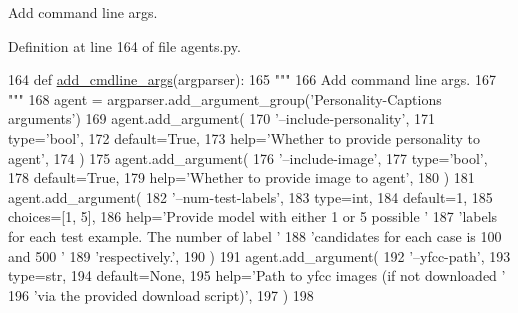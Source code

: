 \begin{DoxyVerb}Add command line args.
\end{DoxyVerb}
 

Definition at line 164 of file agents.\+py.


\begin{DoxyCode}
164     \textcolor{keyword}{def }\hyperlink{namespaceparlai_1_1agents_1_1drqa_1_1config_a62fdd5554f1da6be0cba185271058320}{add\_cmdline\_args}(argparser):
165         \textcolor{stringliteral}{"""}
166 \textcolor{stringliteral}{        Add command line args.}
167 \textcolor{stringliteral}{        """}
168         agent = argparser.add\_argument\_group(\textcolor{stringliteral}{'Personality-Captions arguments'})
169         agent.add\_argument(
170             \textcolor{stringliteral}{'--include-personality'},
171             type=\textcolor{stringliteral}{'bool'},
172             default=\textcolor{keyword}{True},
173             help=\textcolor{stringliteral}{'Whether to provide personality to agent'},
174         )
175         agent.add\_argument(
176             \textcolor{stringliteral}{'--include-image'},
177             type=\textcolor{stringliteral}{'bool'},
178             default=\textcolor{keyword}{True},
179             help=\textcolor{stringliteral}{'Whether to provide image to agent'},
180         )
181         agent.add\_argument(
182             \textcolor{stringliteral}{'--num-test-labels'},
183             type=int,
184             default=1,
185             choices=[1, 5],
186             help=\textcolor{stringliteral}{'Provide model with either 1 or 5 possible '}
187             \textcolor{stringliteral}{'labels for each test example. The number of label '}
188             \textcolor{stringliteral}{'candidates for each case is 100 and 500 '}
189             \textcolor{stringliteral}{'respectively.'},
190         )
191         agent.add\_argument(
192             \textcolor{stringliteral}{'--yfcc-path'},
193             type=str,
194             default=\textcolor{keywordtype}{None},
195             help=\textcolor{stringliteral}{'Path to yfcc images (if not downloaded '}
196             \textcolor{stringliteral}{'via the provided download script)'},
197         )
198 
\end{DoxyCode}
\mbox{\label{classparlai_1_1tasks_1_1personality__captions_1_1agents_1_1PersonalityCaptionsTeacher_a2f146ae93a6b1f19e570ef7aa8950c1b}} 
